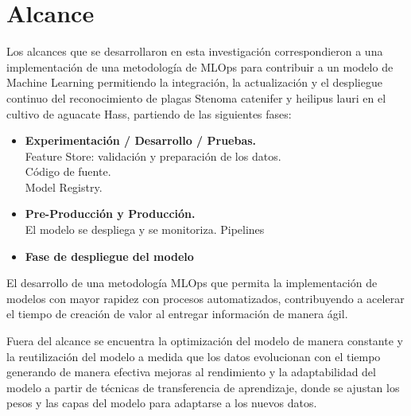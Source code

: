 \section{Alcance}
Los alcances que se desarrollaron en esta investigación correspondieron a una implementación de una metodología de MLOps para contribuir a un modelo de Machine Learning permitiendo la integración, la actualización y el despliegue continuo del reconocimiento de plagas Stenoma catenifer y heilipus lauri en el cultivo de aguacate Hass, partiendo de las siguientes fases:

\begin{itemize}
  \item \textbf{Experimentación / Desarrollo / Pruebas.}\\
    Feature Store: validación y preparación de los datos.\\
    Código de fuente.\\
    Model Registry.
  \item \textbf{Pre-Producción y Producción.}\\
    El modelo se despliega y se monitoriza.
    Pipelines
  \item \textbf{Fase de despliegue del modelo}
\end{itemize}

El desarrollo de una metodología MLOps que permita la implementación de modelos con mayor rapidez con procesos automatizados, contribuyendo a acelerar el tiempo de creación de valor al entregar información de manera ágil.

Fuera del alcance se encuentra la optimización del modelo de manera constante y la reutilización del modelo a medida que los datos evolucionan con el tiempo generando de manera efectiva mejoras al rendimiento y la adaptabilidad del modelo a partir de técnicas de transferencia de aprendizaje, donde se ajustan los pesos y las capas del modelo para adaptarse a los nuevos datos.

